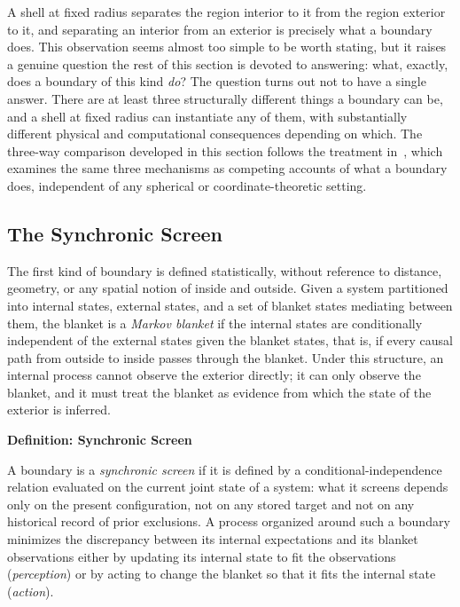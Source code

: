 \documentclass[11pt,fleqn]{book}
\numberwithin{equation}{chapter}
\newenvironment{definition}[1]
  {\begin{definitionEnv}
   \noindent\textbf{Definition: #1}\par\smallskip}
  {\end{definitionEnv}}
\theoremstyle{plain}
\theoremstyle{definition}
\theoremstyle{remark}
\begin{document}
A shell at fixed radius separates the region interior to it from the region exterior to it, and separating an interior from an exterior is precisely what a boundary does. This observation seems almost too simple to be worth stating, but it raises a genuine question the rest of this section is devoted to answering: what, exactly, does a boundary of this kind \emph{do}? The question turns out not to have a single answer. There are at least three structurally different things a boundary can be, and a shell at fixed radius can instantiate any of them, with substantially different physical and computational consequences depending on which. The three-way comparison developed in this section follows the treatment in~\cite{boundaries}, which examines the same three mechanisms as competing accounts of what a boundary does, independent of any spherical or coordinate-theoretic setting.

\subsection{The Synchronic Screen}

The first kind of boundary is defined statistically, without reference to distance, geometry, or any spatial notion of inside and outside. Given a system partitioned into internal states, external states, and a set of blanket states mediating between them, the blanket is a \emph{Markov blanket} if the internal states are conditionally independent of the external states given the blanket states, that is, if every causal path from outside to inside passes through the blanket. Under this structure, an internal process cannot observe the exterior directly; it can only observe the blanket, and it must treat the blanket as evidence from which the state of the exterior is inferred.

\begin{definition}{Synchronic Screen}
A boundary is a \emph{synchronic screen} if it is defined by a conditional-independence relation evaluated on the current joint state of a system: what it screens depends only on the present configuration, not on any stored target and not on any historical record of prior exclusions. A process organized around such a boundary minimizes the discrepancy between its internal expectations and its blanket observations either by updating its internal state to fit the observations (\emph{perception}) or by acting to change the blanket so that it fits the internal state (\emph{action}).
\end{definition}
\end{document}
